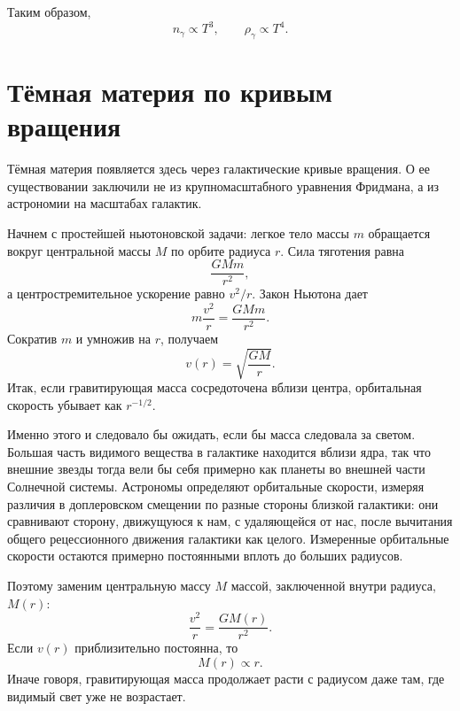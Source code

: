 Таким образом,
\begin{equation}
n_\gamma\propto T^3,
\qquad
\rho_\gamma\propto T^4.
\end{equation}

\section{Тёмная материя по кривым вращения}

Тёмная материя появляется здесь через галактические кривые вращения. О ее существовании заключили не из крупномасштабного уравнения Фридмана, а из астрономии на масштабах галактик.

Начнем с простейшей ньютоновской задачи: легкое тело массы \(m\) обращается вокруг центральной массы \(M\) по орбите радиуса \(r\). Сила тяготения равна
\begin{equation}
\frac{GMm}{r^2},
\end{equation}
а центростремительное ускорение равно \(v^2/r\). Закон Ньютона дает
\begin{equation}
m\frac{v^2}{r}=\frac{GMm}{r^2}.
\end{equation}
Сократив \(m\) и умножив на \(r\), получаем
\begin{equation}
v(r)=\sqrt{\frac{GM}{r}}.
\end{equation}
Итак, если гравитирующая масса сосредоточена вблизи центра, орбитальная скорость убывает как \(r^{-1/2}\).

Именно этого и следовало бы ожидать, если бы масса следовала за светом. Большая часть видимого вещества в галактике находится вблизи ядра, так что внешние звезды тогда вели бы себя примерно как планеты во внешней части Солнечной системы. Астрономы определяют орбитальные скорости, измеряя различия в доплеровском смещении по разные стороны близкой галактики: они сравнивают сторону, движущуюся к нам, с удаляющейся от нас, после вычитания общего рецессионного движения галактики как целого. Измеренные орбитальные скорости остаются примерно постоянными вплоть до больших радиусов.

Поэтому заменим центральную массу \(M\) массой, заключенной внутри радиуса, \(M(r)\):
\begin{equation}
\frac{v^2}{r}=\frac{G M(r)}{r^2}.
\end{equation}
Если \(v(r)\) приблизительно постоянна, то
\begin{equation}
M(r)\propto r.
\end{equation}
Иначе говоря, гравитирующая масса продолжает расти с радиусом даже там, где видимый свет уже не возрастает.

